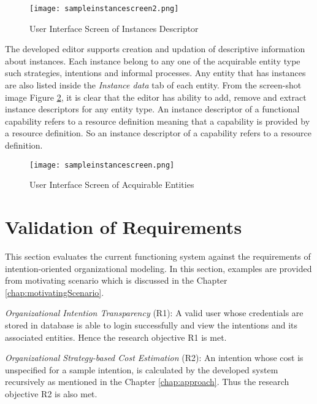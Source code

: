 \begin{figure}
	\centering
	\texttt{[image: sampleinstancescreen2.png]}
	\caption{User Interface Screen of Instances Descriptor}
	\label{fig:realizationofinstances2}
\end{figure}

The developed editor supports creation and updation of descriptive information about instances. Each instance belong to any one of the acquirable entity type such strategies, intentions and informal processes. Any entity that has instances are also listed inside the \textit{Instance data} tab of each entity. From the screen-shot image Figure \ref{fig:realizationofinstances}, it is clear that the editor has ability to add, remove and extract instance descriptors for any entity type. An instance descriptor of a functional capability refers to a resource definition meaning that a capability is provided by a resource definition. So an instance descriptor of a capability refers to a resource definition.

\begin{figure}
	\centering
	\texttt{[image: sampleinstancescreen.png]}
	\caption{User Interface Screen of Acquirable Entities}
	\label{fig:realizationofinstances}
\end{figure}

		
\section{Validation of Requirements}
\label{sec:validation}
This section evaluates the current functioning system against the requirements of intention-oriented organizational modeling. In this section, examples are provided from motivating scenario which is discussed in the Chapter \ref{chap:motivatingScenario}. 

\textit{Organizational Intention Transparency} (R1): A valid user whose credentials are stored in database is able to login successfully and view the intentions and its associated entities. Hence the research objective R1 is met.

\textit{Organizational Strategy-based Cost Estimation} (R2): An intention whose cost is unspecified for a sample intention, is calculated by the developed system recursively as mentioned in the Chapter \ref{chap:approach}. Thus the research objective R2 is also met.

